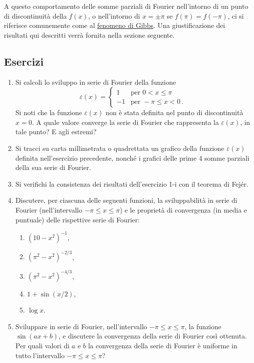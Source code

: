 \documentclass[11pt, a4paper]{book}
\numberwithin{equation}{section}
\newenvironment{esercizi}{\subsection*{Esercizi}\begin{enumerate}}{\end{enumerate}}
\begin{document}
A questo comportamento delle somme parziali di Fourier nell'intorno di un punto di discontinuità della $f(x)$, o nell'intorno di $x=\pm\pi$ se $f(\pi)=f(-\pi)$, ci si riferisce comunemente come al \uline{fenomeno di Gibbs}. Una giustificazione dei risultati qui descritti verrà fornita nella sezione seguente.

\begin{esercizi}
\item Si calcoli lo sviluppo in serie di Fourier della funzione
\[
  \varepsilon(x) = \begin{cases} 1 & \text{per } 0 < x \leq \pi \\ -1 & \text{per } -\pi \leq x < 0\,. \end{cases}
\]
Si noti che la funzione $\varepsilon(x)$ non è stata definita nel punto di discontinuità $x=0$. A quale valore converge la serie di Fourier che rappresenta la $\varepsilon(x)$, in tale punto? E agli estremi?

\item Si tracci su carta millimetrata o quadrettata un grafico della funzione $\varepsilon(x)$ definita nell'esercizio precedente, nonché i grafici delle prime 4 somme parziali della sua serie di Fourier.

\item Si verifichi la consistenza dei risultati dell'esercizio 1-i con il teorema di Fejér.

\item Discutere, per ciascuna delle seguenti funzioni, la sviluppabilità in serie di Fourier (nell'intervallo $-\pi \leq x \leq \pi$) e le proprietà di convergenza (in media e puntuale) delle rispettive serie di Fourier:
\begin{enumerate}
  \item $(10-x^2)^{-1}$,
  \item $(\pi^2-x^2)^{-2/3}$,
  \item $(\pi^2-x^2)^{-4/3}$,
  \item $1+\sin(x/2)$,
  \item $\log x$.
\end{enumerate}

\item Sviluppare in serie di Fourier, nell'intervallo $-\pi \leq x \leq \pi$, la funzione $\sin(ax+b)$, e discutere la convergenza della serie di Fourier così ottenuta. Per quali valori di $a$ e $b$ la convergenza della serie di Fourier è uniforme in tutto l'intervallo $-\pi \leq x \leq \pi$?
\end{esercizi}
\end{document}
